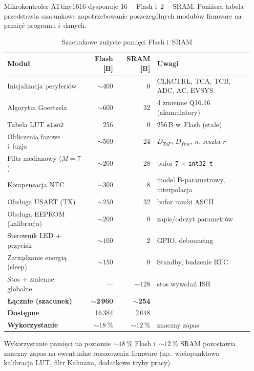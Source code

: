 \documentclass[a4paper,11pt]{article}
\begin{document}
	Mikrokontroler ATtiny1616 dysponuje \SI{16}{\kilo\byte} Flash i~\SI{2}{\kilo\byte}
	SRAM. Poniższa tabela przedstawia szacunkowe zapotrzebowanie poszczególnych
	modułów firmware na pamięć programu i~danych.
	
	\begin{table}[H]
		\centering
		\caption{Szacunkowe zużycie pamięci Flash i~SRAM}
		\label{tab:flash_sram}
		\begin{tabular}{l r r l}
			\toprule
			\textbf{Moduł} & \textbf{Flash [B]} & \textbf{SRAM [B]} & \textbf{Uwagi} \\
			\midrule
			Inicjalizacja peryferiów    & ${\sim}400$  & 0        & CLKCTRL, TCA, TCB, ADC, AC, EVSYS \\
			Algorytm Goertzela          & ${\sim}600$  & 32       & 4 zmienne Q16.16 (akumulatory) \\
			Tabela LUT \texttt{atan2}   & 256          & 0        & 256\,B w~Flash (stałe) \\
			Obliczenia fazowe i~fuzja   & ${\sim}500$  & 24       & $D_{ToF}$, $D_{fine}$, $n$, reszta $r$ \\
			Filtr medianowy ($M = 7$)   & ${\sim}200$  & 28       & bufor 7 $\times$ \texttt{int32\_t} \\
			Kompensacja NTC             & ${\sim}300$  & 8        & model B-parametrowy, interpolacja \\
			Obsługa USART (TX)          & ${\sim}250$  & 32       & bufor ramki ASCII \\
			Obsługa EEPROM (kalibracja) & ${\sim}200$  & 0        & zapis/odczyt parametrów \\
			Sterownik LED + przycisk    & ${\sim}100$  & 2        & GPIO, debouncing \\
			Zarządzanie energią (sleep) & ${\sim}150$  & 0        & Standby, budzenie RTC \\
			Stos + zmienne globalne     & ---          & ${\sim}128$ & stos wywołań ISR \\
			\midrule
			\textbf{Łącznie (szacunek)} & \textbf{${\sim}$2\,960} & \textbf{${\sim}$254} &  \\
			\midrule
			\textbf{Dostępne}           & 16\,384      & 2\,048   &  \\
			\textbf{Wykorzystanie}      & ${\sim}\SI{18}{\percent}$ & ${\sim}\SI{12}{\percent}$ & znaczny zapas \\
			\bottomrule
		\end{tabular}
	\end{table}
	
	Wykorzystanie pamięci na poziomie ${\sim}\SI{18}{\percent}$ Flash
	i~${\sim}\SI{12}{\percent}$ SRAM pozostawia znaczny zapas na ewentualne
	rozszerzenia firmware (np.\ wielopunktowa kalibracja LUT, filtr Kalmana,
	dodatkowe tryby pracy).
	
\end{document}
